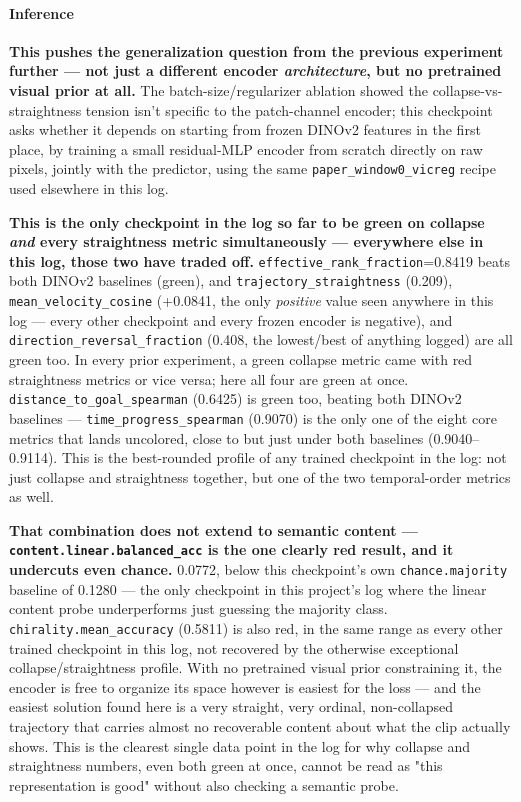\paragraph{Inference}

\textbf{This pushes the generalization question from the previous experiment
further --- not just a different encoder \emph{architecture}, but no pretrained visual
prior at all.} The batch-size/regularizer ablation showed the collapse-vs-straightness
tension isn't specific to the patch-channel encoder; this checkpoint asks whether it
depends on starting from frozen DINOv2 features in the first place, by training a small
residual-MLP encoder from scratch directly on raw pixels, jointly with the predictor,
using the same \texttt{paper\_window0\_vicreg} recipe used elsewhere in this log.

\textbf{This is the only checkpoint in the log so far to be green on collapse
\emph{and} every straightness metric simultaneously --- everywhere else in this log,
those two have traded off.} \texttt{effective\_rank\_fraction}=0.8419 beats both DINOv2
baselines (green), and \texttt{trajectory\_straightness} (0.209), \texttt{mean\_velocity\_cosine}
(+0.0841, the only \emph{positive} value seen anywhere in this log --- every other
checkpoint and every frozen encoder is negative), and \texttt{direction\_reversal\_fraction}
(0.408, the lowest/best of anything logged) are all green too. In every prior experiment,
a green collapse metric came with red straightness metrics or vice versa; here all four
are green at once. \texttt{distance\_to\_goal\_spearman} (0.6425) is green too, beating
both DINOv2 baselines --- \texttt{time\_progress\_spearman} (0.9070) is the only one of
the eight core metrics that lands uncolored, close to but just under both baselines
(0.9040--0.9114). This is the best-rounded profile of any trained checkpoint in the log:
not just collapse and straightness together, but one of the two temporal-order metrics
as well.

\textbf{That combination does not extend to semantic content --- \texttt{content.linear.balanced\_acc}
is the one clearly red result, and it undercuts even chance.} 0.0772, below this
checkpoint's own \texttt{chance.majority} baseline of 0.1280 --- the only checkpoint in
this project's log where the linear content probe underperforms just guessing the
majority class. \texttt{chirality.mean\_accuracy} (0.5811) is also red, in the same
range as every other trained checkpoint in this log, not recovered by the otherwise
exceptional collapse/straightness profile. With no pretrained visual prior constraining
it, the encoder is free to organize its space however is easiest for the loss --- and
the easiest solution found here is a very straight, very ordinal, non-collapsed
trajectory that carries almost no recoverable content about what the clip actually
shows. This is the clearest single data point in the log for why collapse and
straightness numbers, even both green at once, cannot be read as "this representation is
good" without also checking a semantic probe.

